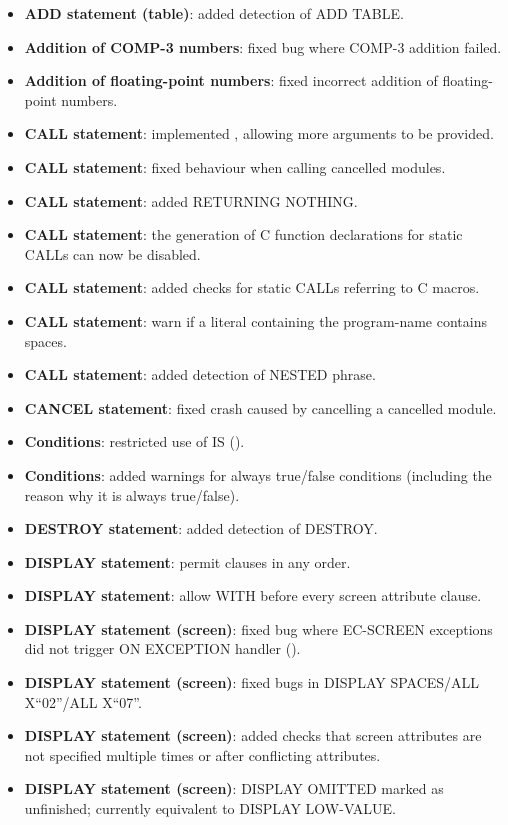 \begin{itemize}
\item \textbf{ADD statement (table)}: added detection of ADD TABLE.
\item \textbf{Addition of COMP-3 numbers}: fixed bug where COMP-3 addition failed.
\item \textbf{Addition of floating-point numbers}: fixed incorrect addition of floating-point numbers.
\item \textbf{CALL statement}: implemented , allowing more arguments to be provided.
\item \textbf{CALL statement}: fixed behaviour when calling cancelled modules.
\item \textbf{CALL statement}: added RETURNING NOTHING. %
\item \textbf{CALL statement}: the generation of C function declarations for static CALLs can now be disabled.
\item \textbf{CALL statement}: added checks for static CALLs referring to C macros.
\item \textbf{CALL statement}: warn if a literal containing the program-name contains spaces.
\item \textbf{CALL statement}: added detection of NESTED phrase.
\item \textbf{CANCEL statement}: fixed crash caused by cancelling a cancelled module.
\item \textbf{Conditions}: restricted use of IS ().
\item \textbf{Conditions}: added warnings for always true\slash{}false conditions (including the reason why it is always true\slash{}false).
\item \textbf{DESTROY statement}: added detection of DESTROY.
\item \textbf{DISPLAY statement}: permit clauses in any order.
\item \textbf{DISPLAY statement}: allow WITH before every screen attribute clause.
\item \textbf{DISPLAY statement (screen)}: fixed bug where EC-SCREEN exceptions did not trigger ON EXCEPTION handler ().
\item \textbf{DISPLAY statement (screen)}: fixed bugs in DISPLAY SPACES\slash{}ALL X``02''\slash{}ALL X``07''.
\item \textbf{DISPLAY statement (screen)}: added checks that screen attributes are not specified multiple times or after conflicting attributes.
\item \textbf{DISPLAY statement (screen)}: DISPLAY OMITTED marked as unfinished; currently equivalent to DISPLAY LOW-VALUE.

\end{itemize}
